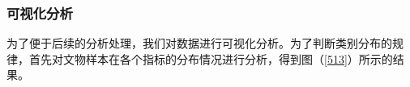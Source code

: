 \documentclass{my_paper}
\begin{document}
\subsubsection{可视化分析}
为了便于后续的分析处理，我们对数据进行可视化分析。为了判断类别分布的规律，首先对文物样本在各个指标的分布情况进行分析，得到图（\ref{513}）所示的结果。
\begin{figure}[htbp]
    \centering  %
    \\
    \subfigure[颜色分布]{ %
}
\end{figure}
\end{document}
